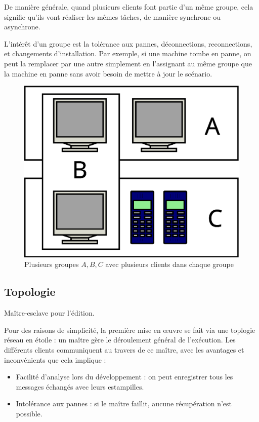 \documentclass{article}
\begin{document}
De manière générale, quand plusieurs clients font partie d'un même groupe, cela signifie qu'ils vont réaliser les mêmes tâches, de manière synchrone ou asynchrone.

L'intérêt d'un groupe est la tolérance aux pannes, déconnections, reconnections, et changements d'installation. 
Par exemple, si une machine tombe en panne, on peut la remplacer par une autre simplement en l'assignant au même groupe que la machine en panne 
sans avoir besoin de mettre à jour le scénario.


\begin{figure}[h]
	\centering
	\includegraphics[scale=0.2]{images/groupes.eps}
	\caption{Plusieurs groupes $A,B,C$ avec plusieurs clients dans chaque groupe}
	\label{img.groupes}
\end{figure}


\subsection{Topologie}
Maître-esclave pour l'édition.

Pour des raisons de simplicité, la première mise en œuvre se fait via une toplogie réseau en étoile : un maître gère 
le déroulement général de l'exécution. 
Les différents clients communiquent au travers de ce maître, avec les avantages et inconvénients que cela implique : 
\begin{itemize}
	\item Facilité d'analyse lors du développement : on peut enregistrer tous les messages échangés avec leurs estampilles.
	\item Intolérance aux pannes : si le maître faillit, aucune récupération n'est possible.
\end{itemize}
\end{document}
